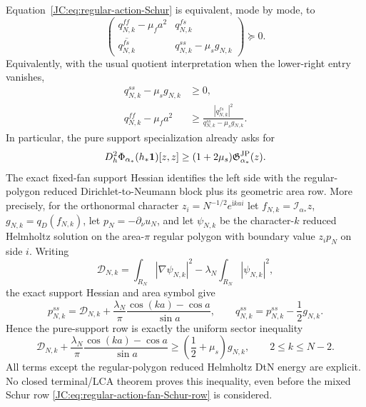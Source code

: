 \begin{contract}
Equation~\eqref{JC:eq:regular-action-Schur} is equivalent, mode by mode, to
\begin{equation}\label{JC:eq:regular-action-mode-matrix}
 \boxed{
 \begin{pmatrix}
  q^{ff}_{N,k}-\mu_fa^2&q^{fs}_{N,k}\\
  \overline{q^{fs}_{N,k}}&q^{ss}_{N,k}-\mu_sg_{N,k}
 \end{pmatrix}\succeq0.}
\end{equation}
Equivalently, with the usual quotient interpretation when the lower-right
entry vanishes,
\begin{align}
 q^{ss}_{N,k}-\mu_sg_{N,k}&\ge0,
 \label{JC:eq:regular-action-support-row}\\
 q^{ff}_{N,k}-\mu_fa^2
 &\ge\frac{|q^{fs}_{N,k}|^2}
 {q^{ss}_{N,k}-\mu_sg_{N,k}}.
 \label{JC:eq:regular-action-fan-Schur-row}
\end{align}
In particular, the pure support specialization already asks for
\begin{equation}\label{JC:eq:regular-action-support-gap}
 D_h^2\Phi_{\alpha_*}(h_*\mathbf1)[z,z]
 \ge(1+2\mu_s)\mathfrak G^{\rm JP}_{\alpha_*}(z).
\end{equation}
The exact fixed-fan support Hessian identifies the left side with the
regular-polygon reduced Dirichlet-to-Neumann block plus its geometric
area row.  More precisely, for the orthonormal character
$z_i=N^{-1/2}e^{\mathrm i k a i}$ let
$f_{N,k}=\mathcal I_{\alpha_*}z$,
$g_{N,k}=q_D(f_{N,k})$, let $p_N=-\partial_\nu u_N$, and let
$\psi_{N,k}$ be the character-$k$ reduced Helmholtz solution on the
area-$\pi$ regular polygon with boundary value $z_ip_N$ on side $i$.
Writing
\[
 \mathscr D_{N,k}=\int_{R_N}|\nabla\psi_{N,k}|^2
 -\lambda_N\int_{R_N}|\psi_{N,k}|^2,
\]
the exact support Hessian and area symbol give
\begin{equation}\label{JC:eq:regular-support-DtN-sector}
 \boxed{
 p^{ss}_{N,k}=\mathscr D_{N,k}
 +\frac{\lambda_N}{\pi}
   \frac{\cos(ka)-\cos a}{\sin a},
 \qquad
 q^{ss}_{N,k}=p^{ss}_{N,k}-\frac12g_{N,k}.}
\end{equation}
Hence the pure-support row is exactly the uniform sector inequality
\[
 \mathscr D_{N,k}
 +\frac{\lambda_N}{\pi}
   \frac{\cos(ka)-\cos a}{\sin a}
 \ge\left(\frac12+\mu_s\right)g_{N,k},
 \qquad 2\le k\le N-2.
\]
All terms except the regular-polygon reduced Helmholtz DtN energy are
explicit.  No closed terminal/LCA theorem proves this inequality, even
before the mixed Schur row
\eqref{JC:eq:regular-action-fan-Schur-row} is considered.


\end{contract}
